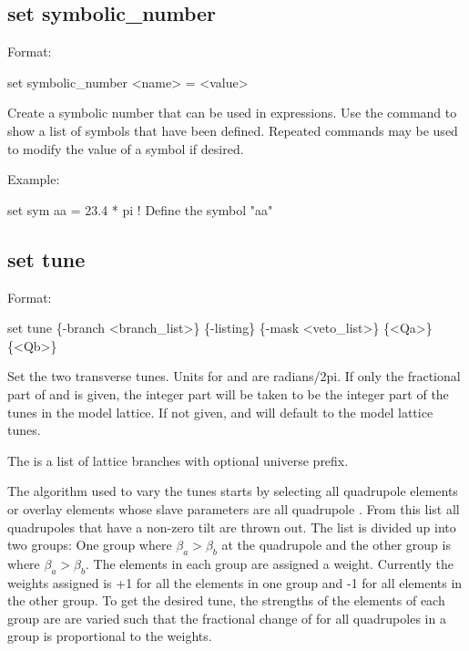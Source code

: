 {{{{{{%

\subsection{set symbolic_number}
\label{s:set.symbolic}

Format:
\begin{example}
  set symbolic_number <name> = <value>
\end{example}

Create a symbolic number that can be used in expressions. Use the  command
to show a list of symbols that have been defined. Repeated  commands may be used to modify
the value of a symbol if desired.

Example:
\begin{example}
  set sym aa = 23.4 * pi  ! Define the symbol "aa"
\end{example}


\subsection{set tune}
\label{s:set.tune}

Format:
\begin{example}
  set tune \{-branch <branch_list>\} \{-listing\} \{-mask <veto_list>\} \{<Qa>\} \{<Qb>\}
\end{example}

Set the two transverse tunes. Units for  and  are radians/2pi. If only the
fractional part of  and  is given, the integer part will be taken to be the
integer part of the tunes in the model lattice. If not given,  and  will
default to the model lattice tunes.

The  is a list of lattice branches with optional universe prefix.

The algorithm used to vary the tunes starts by selecting all quadrupole elements or overlay elements
whose slave parameters are all quadrupole . From this list all quadrupoles that have a
non-zero tilt are thrown out. The list is divided up into two groups: One group where $\beta_a >
\beta_b$ at the quadrupole and the other group is where $\beta_a > \beta_b$. The elements in each
group are assigned a weight. Currently the weights assigned is +1 for all the elements in one group
and -1 for all elements in the other group. To get the desired tune, the  strengths of the
elements of each group are are varied such that the fractional change of  for all
quadrupoles in a group is proportional to the weights. 

}}}}}}

